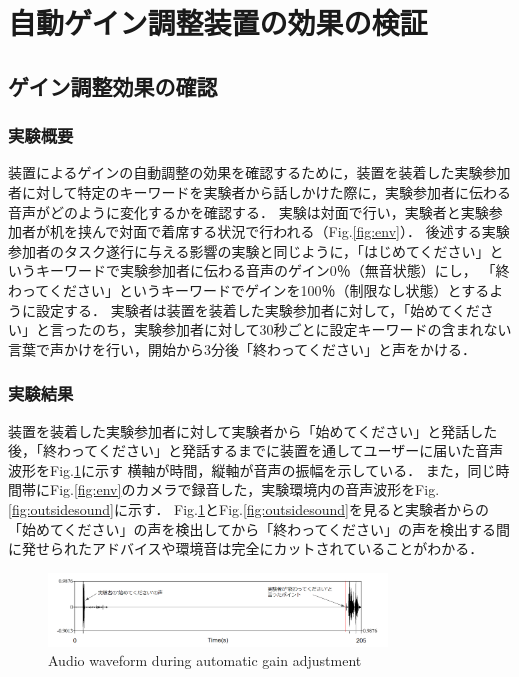 \documentclass[a4paper]{jarticle}
\begin{document}
\section{自動ゲイン調整装置の効果の検証}
\subsection{ゲイン調整効果の確認}
\subsubsection{実験概要}
装置によるゲインの自動調整の効果を確認するために，装置を装着した実験参加者に対して特定のキーワードを実験者から話しかけた際に，実験参加者に伝わる音声がどのように変化するかを確認する．
実験は対面で行い，実験者と実験参加者が机を挟んで対面で着席する状況で行われる（Fig.\ref{fig:env}）．
後述する実験参加者のタスク遂行に与える影響の実験と同じように，「はじめてください」というキーワードで実験参加者に伝わる音声のゲイン0％（無音状態）にし，
「終わってください」というキーワードでゲインを100％（制限なし状態）とするように設定する．
実験者は装置を装着した実験参加者に対して，「始めてください」と言ったのち，実験参加者に対して30秒ごとに設定キーワードの含まれない言葉で声かけを行い，開始から3分後「終わってください」と声をかける．
\subsubsection{実験結果}
装置を装着した実験参加者に対して実験者から「始めてください」と発話した後，「終わってください」と発話するまでに装置を通してユーザーに届いた音声波形をFig.\ref{fig:voice}に示す
横軸が時間，縦軸が音声の振幅を示している．
また，同じ時間帯にFig.\ref{fig:env}のカメラで録音した，実験環境内の音声波形をFig.\ref{fig:outsidesound}に示す．
Fig.\ref{fig:voice}とFig.\ref{fig:outsidesound}を見ると実験者からの「始めてください」の声を検出してから「終わってください」の声を検出する間に発せられたアドバイスや環境音は完全にカットされていることがわかる．

\begin{figure}[htbp]
  \begin{center}
  \includegraphics[width=90mm]{voice2.PNG}
  \caption{Audio waveform during automatic gain adjustment}
  \label{fig:voice}
  \end{center}
  \end{figure}
\end{document}
